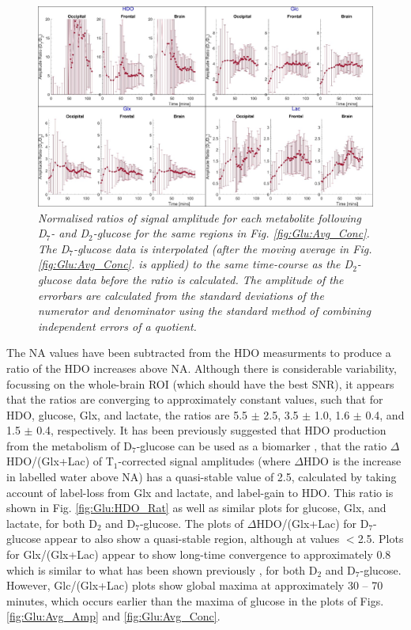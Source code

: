 \begin{figure}
    \centering
    \includegraphics[width = 1\textwidth]{Figures/Glucose/D7_D2.png}
    \caption{\textit{Normalised ratios of signal amplitude for each metabolite following D$_7$- and D$_2$-glucose for the same regions in Fig. \ref{fig:Glu:Avg_Conc}. The D$_7$-glucose data is interpolated (after the moving average in Fig. \ref{fig:Glu:Avg_Conc}. is applied) to the same time-course as the D$_2$-glucose data before the ratio is calculated. The amplitude of the errorbars are calculated from the standard deviations of the numerator and denominator using the standard method of combining independent errors of a quotient.}}
    \label{fig:Glu:D7_D2}
\end{figure}

The \ac{NA} values have been subtracted from the \ac{HDO} measurments to produce a ratio of the \ac{HDO} increases above \ac{NA}. Although there is considerable variability, focussing on the whole-brain \ac{ROI} (which should have the best \ac{SNR}), it appears that the ratios are converging to approximately constant values, such that for \ac{HDO}, glucose, Glx, and lactate, the ratios are 5.5 $\pm$ 2.5, 3.5 $\pm$ 1.0, 1.6 $\pm$ 0.4, and 1.5 $\pm$ 0.4, respectively. It has been previously suggested that \ac{HDO} production from the metabolism of D$_7$-glucose can be used as a biomarker \cite{Mahar2021DeuteratedGlucose}, that the ratio $\Delta$HDO/(Glx+Lac) of T$_1$-corrected signal amplitudes (where $\Delta$HDO is the increase in labelled water above \ac{NA}) has a quasi-stable value of 2.5, calculated by taking account of label-loss from Glx and lactate, and label-gain to \ac{HDO}. This ratio is shown in Fig. \ref{fig:Glu:HDO_Rat} as well as similar plots for glucose, Glx, and lactate, for both D$_2$ and D$_7$-glucose. The plots of $\Delta$HDO/(Glx+Lac) for D$_7$-glucose appear to also show a quasi-stable region, although at values $<$2.5. Plots for Glx/(Glx+Lac) appear to show long-time convergence to approximately 0.8 which is similar to what has been shown previously \cite{Kaggie2022DeuteriumMetabolism}, for both D$_2$ and D$_7$-glucose. However, Glc/(Glx+Lac) plots show global maxima at approximately 30 – 70 minutes, which occurs earlier than the maxima of glucose in the plots of Figs. \ref{fig:Glu:Avg_Amp} and \ref{fig:Glu:Avg_Conc}.  

